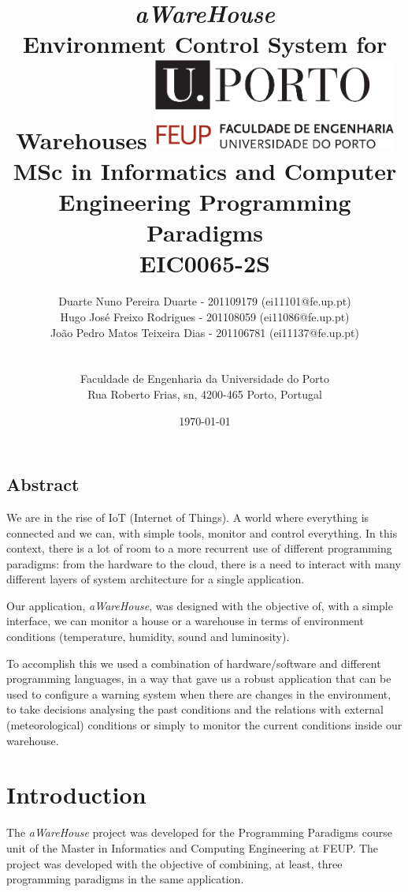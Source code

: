 \documentclass[12pt]{report}
\title{
\huge{\textbf{\textit{aWareHouse}}}\linebreak
\Large\textbf{\\Environment Control System for Warehouses}\linebreak\linebreak\linebreak
\includegraphics[width=8cm]{feup.pdf}\linebreak \linebreak
\large{MSc in Informatics and Computer Engineering} \linebreak
\large{Programming Paradigms \\ EIC0065-2S}\linebreak
}
\author{
Duarte Nuno Pereira Duarte - 201109179 (ei11101@fe.up.pt)\\
Hugo José Freixo Rodrigues - 201108059 (ei11086@fe.up.pt)\\
João Pedro Matos Teixeira Dias - 201106781 (ei11137@fe.up.pt)\\
\\
\\ Faculdade de Engenharia da Universidade do Porto \\ Rua Roberto Frias, s\/n, 4200-465 Porto, Portugal
}
\date{\today}
\begin{document}
\clearpage\maketitle
\thispagestyle{empty}

\newpage
\section*{Abstract}

We are in the rise of IoT (Internet of Things). A world where everything is connected and we can, with simple tools, monitor and control everything. In this context, there is a lot of room to a more recurrent use of different programming paradigms: from the hardware to the cloud, there is a need to interact with many different layers of system architecture for a single application.

Our application, \textit{aWareHouse}, was designed with the objective of, with a simple interface, we can monitor a house or a warehouse in terms of environment conditions (temperature, humidity, sound and luminosity). 

To accomplish this we used a combination of hardware/software and different programming languages, in a way that gave us a robust application that can be used to configure a warning system when there are changes in the environment, to take decisions analysing the past conditions and the relations with external (meteorological) conditions or simply to monitor the current conditions inside our warehouse.


\newpage
\tableofcontents
\newpage

\chapter{Introduction}

The \textit{aWareHouse} project was developed for the Programming Paradigms course unit of the Master in Informatics and Computing Engineering at FEUP. The project was developed with the objective of combining, at least, three programming paradigms in the same application.
\end{document}
